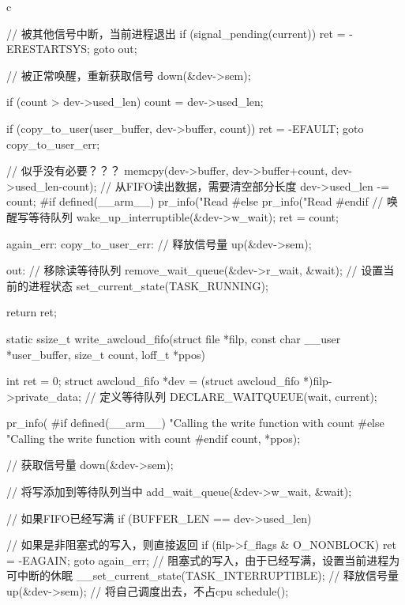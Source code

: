 \begin{code-block}{c}
{{                // 被其他信号中断，当前进程退出
                if (signal_pending(current)) {
                        ret = -ERESTARTSYS;
                        goto out;
                }

                // 被正常唤醒，重新获取信号
                down(&dev->sem);
        }

        if (count > dev->used_len) {
                count = dev->used_len;
        }

        if (copy_to_user(user_buffer, dev->buffer, count)) {
                ret = -EFAULT;
                goto copy_to_user_err;
        }

        // 似乎没有必要？？？
        memcpy(dev->buffer, dev->buffer+count, dev->used_len-count);
        // 从FIFO读出数据，需要清空部分长度
        dev->used_len -= count;
#if defined(__arm__)
        pr_info("Read %
#else
        pr_info("Read %
#endif
        // 唤醒写等待队列
        wake_up_interruptible(&dev->w_wait);
        ret = count;

again_err:
copy_to_user_err:
        // 释放信号量
        up(&dev->sem);

out:
        // 移除读等待队列
        remove_wait_queue(&dev->r_wait, &wait);
        // 设置当前的进程状态
        set_current_state(TASK_RUNNING);

        return ret;
}

static ssize_t write_awcloud_fifo(struct file *filp,
        const char __user *user_buffer, size_t count, loff_t *ppos)
{
        int ret = 0;
        struct awcloud_fifo *dev = (struct awcloud_fifo *)filp->private_data;
        // 定义等待队列
        DECLARE_WAITQUEUE(wait, current);

        pr_info(
#if defined(__arm__)
                "Calling the write function with count %
#else
                "Calling the write function with count %
#endif
                count, *ppos);

        // 获取信号量
        down(&dev->sem);

        // 将写添加到等待队列当中
        add_wait_queue(&dev->w_wait, &wait);

        // 如果FIFO已经写满
        if (BUFFER_LEN == dev->used_len) {
                // 如果是非阻塞式的写入，则直接返回
                if (filp->f_flags & O_NONBLOCK) {
                        ret = -EAGAIN;
                        goto again_err;
                }
                // 阻塞式的写入，由于已经写满，设置当前进程为可中断的休眠
                __set_current_state(TASK_INTERRUPTIBLE);
                // 释放信号量
                up(&dev->sem);
                // 将自己调度出去，不占cpu
                schedule();

}}
\end{code-block}
